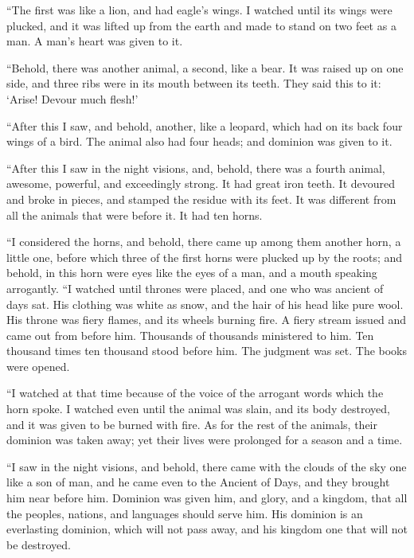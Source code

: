  ``The first was like a lion, and had eagle's wings. I
watched until its wings were plucked, and it was lifted up from the
earth and made to stand on two feet as a man. A man's heart was given to
it.

 ``Behold, there was another animal, a second, like a
bear. It was raised up on one side, and three ribs were in its mouth
between its teeth. They said this to it: `Arise! Devour much flesh!'

 ``After this I saw, and behold, another, like a leopard,
which had on its back four wings of a bird. The animal also had four
heads; and dominion was given to it.

 ``After this I saw in the night visions, and, behold,
there was a fourth animal, awesome, powerful, and exceedingly strong. It
had great iron teeth. It devoured and broke in pieces, and stamped the
residue with its feet. It was different from all the animals that were
before it. It had ten horns.

 ``I considered the horns, and behold, there came up among
them another horn, a little one, before which three of the first horns
were plucked up by the roots; and behold, in this horn were eyes like
the eyes of a man, and a mouth speaking arrogantly.  ``I
watched until thrones were placed, and one who was ancient of days sat.
His clothing was white as snow, and the hair of his head like pure wool.
His throne was fiery flames, and its wheels burning fire.
 A fiery stream issued and came out from before him.
Thousands of thousands ministered to him. Ten thousand times ten
thousand stood before him. The judgment was set. The books were opened.

 ``I watched at that time because of the voice of the
arrogant words which the horn spoke. I watched even until the animal was
slain, and its body destroyed, and it was given to be burned with fire.
 As for the rest of the animals, their dominion was taken
away; yet their lives were prolonged for a season and a time.

 ``I saw in the night visions, and behold, there came
with the clouds of the sky one like a son of man, and he came even to
the Ancient of Days, and they brought him near before him.
 Dominion was given him, and glory, and a kingdom, that
all the peoples, nations, and languages should serve him. His dominion
is an everlasting dominion, which will not pass away, and his kingdom
one that will not be destroyed.

